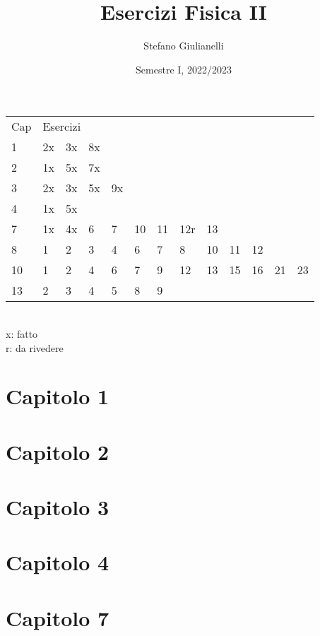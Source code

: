 \documentclass[12pt]{article}
\begin{document}
\author{Stefano Giulianelli}
\title{Esercizi Fisica II}
\date{Semestre I, 2022/2023}
\maketitle{}
\tableofcontents{}
\begin{tabular}{ l l l l l l l l l l l l l }
  Cap & \multicolumn{12}{l}{Esercizi}\\
  1 & 2x & 3x & 8x &&&&&&&&&\\
  2 & 1x & 5x & 7x &&&&&&&&&\\
  3 & 2x & 3x & 5x & 9x &&&&&&&&\\
  4 & 1x & 5x &&&&&&&&&&\\
  7 & 1x & 4x & 6 & 7 & 10 & 11 & 12r & 13 &&&&\\
  8 & 1 & 2 & 3 & 4 & 6 & 7 & 8 & 10 & 11 & 12 &&\\
  10 & 1 & 2 & 4 & 6 & 7 & 9 & 12 & 13 & 15 & 16 & 21 & 23 \\
  13 & 2 & 3 & 4 & 5 & 8 & 9 &&&&&& \\
\end{tabular}
\\x: fatto
\\r: da rivedere
\newpage

\section*{Capitolo 1}



\section*{Capitolo 2}



\section*{Capitolo 3}




\section*{Capitolo 4}


\section*{Capitolo 7}








\end{document}
